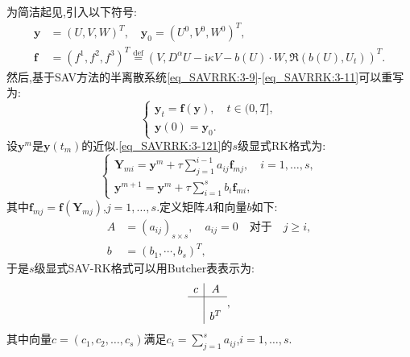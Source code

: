 为简洁起见,引入以下符号:
\begin{equation}
	\begin{aligned}
		\bm{y}&=\left(U,V,W\right)^T,\quad\bm{y}_0=\left(U^0,V^0,W^0\right)^T , \\
		\bm{f}&=(f^1,f^2,f^3)^T\overset{\text{def}}{=}(V,D^{\alpha} U-\mathrm{i}\kappa V-b(U)\cdot W,\Re\left(b(U), U_t\right))^T.
	\end{aligned}
\end{equation}
然后,基于SAV方法的半离散系统\eqref{eq_SAVRRK:3-9}-\eqref{eq_SAVRRK:3-11}可以重写为:
\begin{equation}
\left\{\begin{array}{l}
\bm{y}_t=\bm{f}(\bm{y}),\quad t \in(0, T],\\
\bm{y}(0)=\bm{y}_0.
\end{array}\right.\label{eq_SAVRRK:3-121}
\end{equation}
设$\bm{y}^m$是$\bm{y}\left(t_m\right)$的近似.\eqref{eq_SAVRRK:3-121}的$s$级显式RK格式\cite{hairerRungeKuttaMethods2015}为:
\begin{equation}
\left\{\begin{array}{l}
\bm{Y}_{m i}=\bm{y}^m+\tau \sum\limits_{j=1}^{i-1} a_{i j} \bm{f}_{m j}, \quad i=1, \ldots, s, \\
\bm{y}^{m+1}=\bm{y}^m+\tau \sum\limits_{i=1}^s b_i \bm{f}_{m i},
\end{array}\right.\label{eq_SAVRRK:4-31}
\end{equation}
其中$\bm{f}_{m j}=\bm{f}\left(\bm{Y}_{m j}\right)$,$j=1, \ldots, s$.定义矩阵$A$和向量$b$如下:
\begin{equation}
\begin{aligned}
A & =\left(a_{i j}\right)_{s \times s}, \quad a_{i j}=0 \quad \text {对于} \quad j \geq i, \\
b & =\left(b_1, \cdots, b_s\right)^T,
\end{aligned}
\end{equation}
于是$s$级显式SAV-RK格式可以用Butcher表表示为:
\begin{equation}
\begin{array}{c|c}
c & A \\
\hline \\
& b^T
\end{array},
\end{equation}
其中向量$c=(c_1,c_2,\dots,c_s)$满足$c_i=\sum\limits_{j=1}^s a_{i j}$,$i=1, \ldots, s$.

